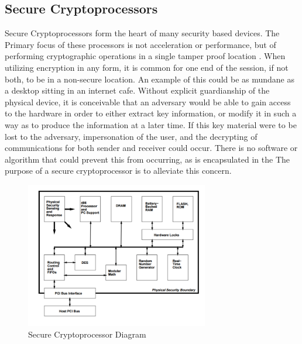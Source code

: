 \documentclass[journal]{IEEEtran}
\begin{document}
\subsection{Secure Cryptoprocessors}

Secure Cryptoprocessors form the heart of many security based devices.  The Primary focus of these processors is not acceleration or performance, but of performing cryptographic operations in a single tamper proof location \cite{coprocesserWhitePaper}.  When utilizing encryption in any form, it is common for one end of the session, if not both, to be in a non-secure location.  An example of this could be as mundane as a desktop sitting in an internet cafe.  Without explicit guardianship of the physical device, it is conceivable that an adversary would be able to gain access to the hardware in order to either extract key information, or modify it in such a way as to produce the information at a later time.  If this key material were to be lost to the adversary, impersonation of the user, and the decrypting of communications for both sender and receiver could occur.  There is no software or algorithm that could prevent this from occurring, as is encapsulated in the The purpose of a secure cryptoprocessor is to alleviate this concern.  

\begin{figure}[htbp]
	\centering
	\includegraphics[width=8cm,keepaspectratio]{img/coprocessorDiagram.png}
	\caption{Secure Cryptoprocessor Diagram \cite{coprocesserWhitePaper} }
	\label{coprocessorDiagram}
\end{figure}
\end{document}
